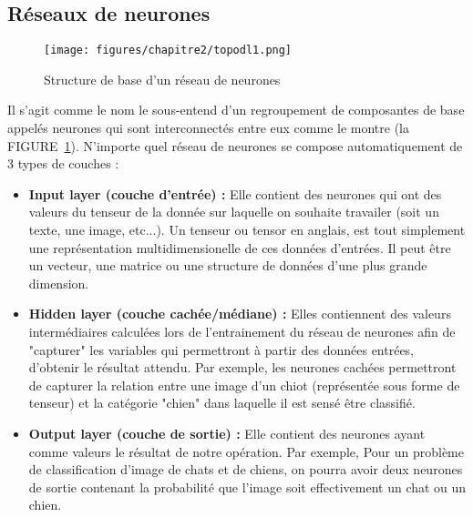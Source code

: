     
        \subsection{Réseaux de neurones}
        
        \begin{figure}[H]
        	\begin{center}
        		\texttt{[image: figures/chapitre2/topodl1.png]}
        	\end{center}
        	\caption {Structure de base d'un réseau de neurones \cite{ch2ref12}}
        	\label{fig:rn_perceptron}
        \end{figure}
       
        \par Il s'agit comme le nom le sous-entend d'un regroupement de composantes de base appelés neurones qui sont interconnectés entre eux comme le montre (la FIGURE~\ref{fig:rn_perceptron}). N'importe quel réseau de neurones se compose automatiquement de 3 types de couches : \cite{ch2ref12,ch2ref4, ch2ref5}
        
        \begin{itemize}[label=•] %
        \setlength{\itemsep}{5pt}
            \item \textbf{Input layer (couche d'entrée) :} Elle contient des neurones qui ont des valeurs du tenseur de la donnée sur laquelle on souhaite travailer (soit un texte, une image, etc...). Un tenseur ou tensor en anglais,  est tout simplement une représentation multidimensionelle de ces données d'entrées. Il peut être un vecteur, une matrice ou une structure de données d'une plus grande dimension.
            
            \item \textbf{Hidden layer (couche cachée/médiane) :} Elles contiennent des valeurs intermédiaires calculées lors de l'entrainement du réseau de neurones afin de "capturer" les variables qui permettront à partir des données entrées, d'obtenir le résultat attendu. Par exemple, les neurones cachées permettront de capturer la relation entre une image d'un chiot (représentée sous forme de tenseur) et la catégorie "chien" dans laquelle il est sensé être classifié.
            
            \item \textbf{Output layer (couche de sortie) :}  Elle contient des neurones ayant comme valeurs le résultat de notre opération. Par exemple, Pour un problème de classification d'image de chats et de chiens, on pourra avoir deux neurones de sortie contenant la probabilité que l'image soit effectivement un chat ou un chien.
            
        \end{itemize}
        
